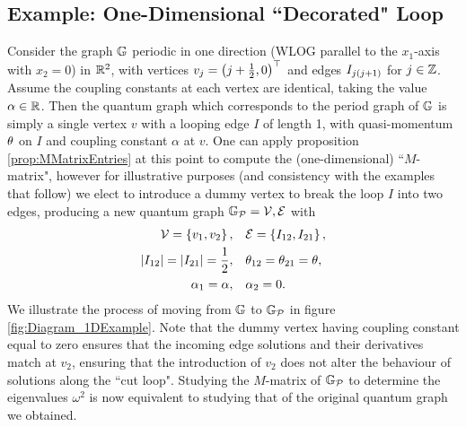 \subsection{Example: One-Dimensional ``Decorated" Loop} \label{ssec:Example1DLoop}
Consider the graph $\mathbb{G}$ periodic in one direction (WLOG parallel to the $x_1$-axis with $x_2=0$) in $\mathbb{R}^2$, with vertices $v_j = \left( j + \frac{1}{2}, 0 \right)^\top$ and edges $I_{j\left( j+1 \right)}$ for $j\in\mathbb{Z}$.
Assume the coupling constants at each vertex are identical, taking the value $\alpha\in\mathbb{R}$.
Then the quantum graph which corresponds to the period graph of $\mathbb{G}$ is simply a single vertex $v$ with a looping edge $I$ of length 1, with quasi-momentum $\theta$ on $I$ and coupling constant $\alpha$ at $v$. 
One can apply proposition \ref{prop:MMatrixEntries} at this point to compute the (one-dimensional) ``$M$-matrix", however for illustrative purposes (and consistency with the examples that follow) we elect to introduce a dummy vertex to break the loop $I$ into two edges, producing a new quantum graph $\mathbb{G}_{\mathcal{P}}=\mathcal{\mathcal{V}, \mathcal{E}}$ with
\begin{align*}
	\mathcal{V} = \left\{  v_1 , v_2  \right\}, \quad &\mathcal{E} = \left\{  I_{12}, I_{21}  \right\}, \\
	\left\lvert I_{12} \right\rvert = \left\lvert I_{21} \right\rvert = \frac{1}{2}, \quad &\theta_{12} = \theta_{21} = \theta, \\
	\alpha_1 = \alpha, \quad &\alpha_2 = 0.
\end{align*}
We illustrate the process of moving from $\mathbb{G}$ to $\mathbb{G}_{\mathcal{P}}$ in figure \ref{fig:Diagram_1DExample}.
Note that the dummy vertex having coupling constant equal to zero ensures that the incoming edge solutions and their derivatives match at $v_2$, ensuring that the introduction of $v_2$ does not alter the behaviour of solutions along the ``cut loop".
Studying the $M$-matrix of $\mathbb{G}_{\mathcal{P}}$ to determine the eigenvalues $\omega^2$ is now equivalent to studying that of the original quantum graph we obtained.
